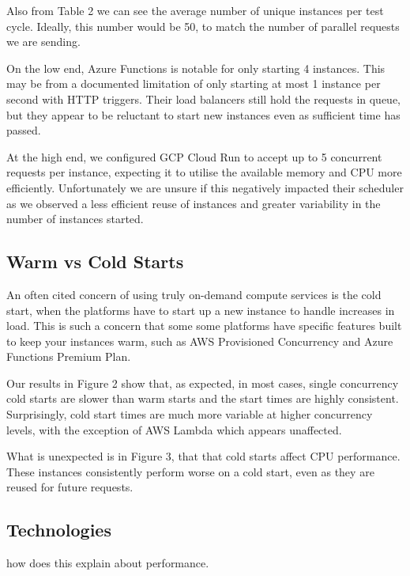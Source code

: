\documentclass[11pt]{article}
\begin{document}
Also from Table 2 %
we can see the average number of unique instances per test cycle.
Ideally, this number would be 50,
to match the number of parallel requests we are sending.

On the low end,
Azure Functions is notable for only starting 4 instances.
This may be from a documented limitation %
of only starting at most 1 instance per second with HTTP triggers.
Their load balancers still hold the requests in queue,
but they appear to be reluctant to start new instances even as sufficient time has passed.

At the high end,
we configured GCP Cloud Run to accept up to 5 concurrent requests per instance,
expecting it to utilise the available memory and CPU more efficiently.
Unfortunately we are unsure if this negatively impacted their scheduler
as we observed a less efficient reuse of instances
and greater variability in the number of instances started.

\subsection{Warm vs Cold Starts}
An often cited concern of using truly on-demand compute services is the cold start,
when the platforms have to start up a new instance to handle increases in load.
This is such a concern that some some platforms have specific features
built to keep your instances warm, such as AWS Provisioned Concurrency %
and Azure Functions Premium Plan.

Our results in Figure 2 %
show that, as expected, in most cases,
single concurrency cold starts are slower than warm starts
and the start times are highly consistent.
Surprisingly, cold start times are much more variable at higher concurrency levels,
with the exception of AWS Lambda which appears unaffected.

What is unexpected is in Figure 3, %
that that cold starts affect CPU performance.
These instances consistently perform worse on a cold start,
even as they are reused for future requests.

\subsection{Technologies}
how does this explain about performance.
\end{document}
